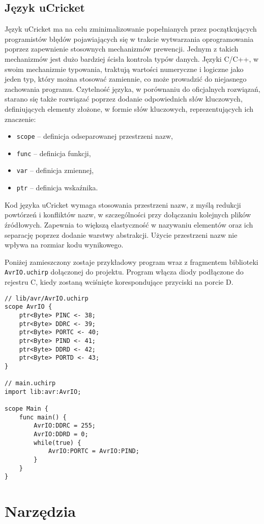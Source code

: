 \subsection{Język uCricket}
Język uCricket ma na celu zminimalizowanie popełnianych przez początkujących programistów błędów pojawiających się w trakcie wytwarzania oprogramowania poprzez zapewnienie stosownych mechanizmów prewencji. Jednym z takich mechanizmów jest dużo bardziej ścisła kontrola typów danych. Języki C/C++, w swoim  mechanizmie typowania, traktują wartości numeryczne i logiczne jako jeden typ, który można stosować zamiennie, co może prowadzić do niejasnego zachowania programu. 
Czytelność języka, w porównaniu do oficjalnych rozwiązań, starano się także rozwiązać poprzez dodanie odpowiednich słów kluczowych, definiujących elementy złożone, w formie słów kluczowych, reprezentujących ich znaczenie:
\begin{itemize}
\item \lstinline|scope| -- definicja odseparowanej przestrzeni nazw,
\item \lstinline|func| -- definicja funkcji,
\item \lstinline|var| -- definicja zmiennej,
\item \lstinline|ptr| -- definicja wskaźnika.
\end{itemize}
Kod języka uCricket wymaga stosowania przestrzeni nazw, z myślą redukcji powtórzeń i konfliktów nazw, w szczególności przy dołączaniu kolejnych plików źródłowych. Zapewnia to większą elastyczność w nazywaniu elementów oraz ich separację poprzez dodanie warstwy abstrakcji. Użycie przestrzeni nazw nie wpływa na rozmiar kodu wynikowego.

Poniżej zamieszczony zostaje przykładowy program wraz z fragmentem biblioteki \lstinline|AvrIO.uchirp| dołączonej do projektu. Program włącza diody podłączone do rejestru C, kiedy zostaną wciśnięte korespondujące przyciski na porcie D.
\begin{lstlisting}
// lib/avr/AvrIO.uchirp
scope AvrIO {
    ptr<Byte> PINC <- 38;
    ptr<Byte> DDRC <- 39;
    ptr<Byte> PORTC <- 40;
    ptr<Byte> PIND <- 41;
    ptr<Byte> DDRD <- 42;
    ptr<Byte> PORTD <- 43;
}

// main.uchirp
import lib:avr:AvrIO;

scope Main {
	func main() {
		AvrIO:DDRC = 255;
		AvrIO:DDRD = 0;
		while(true) {
			AvrIO:PORTC = AvrIO:PIND;	
		}
	}
}
\end{lstlisting}

\section{Narzędzia}

